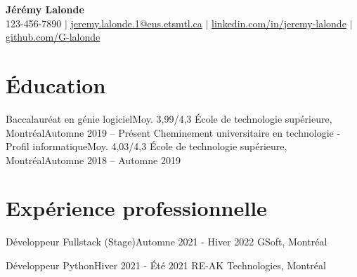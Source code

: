 \documentclass[letterpaper,11pt]{article}
\begin{document}
\begin{center}
  \textbf{\Huge J\'er\'emy Lalonde} \\ \vspace{5pt}
  \small 123-456-7890 $|$ \href{mailto:jeremy.lalonde.1@ens.etsmtl.ca}{jeremy.lalonde.1@ens.etsmtl.ca} $|$
  \href{https://linkedin.com/in/jeremy-lalonde}{linkedin.com/in/jeremy-lalonde} $|$
  \href{https://github.com/G-lalonde}{github.com/G-lalonde} \\ \vspace{3pt}
\end{center}

\section{\'Education}
\resumeSubHeadingListStart
\resumeSubheadingFour
{Baccalaur\'eat en g\'enie logiciel}{Moy. 3,99/4,3}
{\'Ecole de technologie sup\'erieure, Montr\'eal}{Automne 2019 -- Pr\'esent}
\resumeSubheadingFour
{Cheminement universitaire en technologie - Profil informatique}{Moy. 4,03/4,3}
{\'Ecole de technologie sup\'erieure, Montr\'eal}{Automne 2018 -- Automne 2019}
\resumeSubHeadingListEnd

\vspace{1pt}
\section{Exp\'erience professionnelle}
\resumeSubHeadingListStart

\resumeSubheadingThree
{D\'eveloppeur Fullstack (Stage)}{Automne 2021 - Hiver 2022}
{GSoft, Montr\'eal}
\resumeItemListStart
{}
\resumeItemListEnd

\resumeSubheadingThree
{D\'eveloppeur Python}{Hiver 2021 - \'Et\'e 2021}
{RE-AK Technologies, Montr\'eal}
\resumeItemListStart
{}
\resumeItemListEnd
\end{document}
